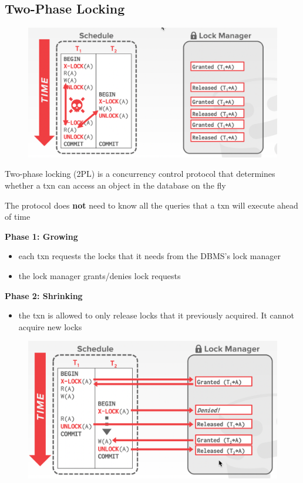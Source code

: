 \documentclass[11pt]{article}
\begin{document}
\subsection{Two-Phase Locking}
\label{sec:orgb16f129}
\begin{figure}[htbp]
\centering
\includegraphics[width=.7\textwidth]{../images/15445/57.png}
\label{}
\end{figure}
Two-phase locking (2PL) is a concurrency control protocol that determines whether a txn can
access an object in the database on the fly

The protocol does \textbf{not} need to know all the queries that a txn will execute ahead of time

\textbf{Phase 1: Growing}
\begin{itemize}
\item each txn requests the locks that it needs from the DBMS's lock manager
\item the lock manager grants/denies lock requests
\end{itemize}

\textbf{Phase 2: Shrinking}
\begin{itemize}
\item the txn is allowed to only release locks that it previously acquired. It cannot acquire new
locks
\end{itemize}

\begin{figure}[htbp]
\centering
\includegraphics[width=.7\textwidth]{../images/15445/58.png}
\label{}
\end{figure}
\end{document}
